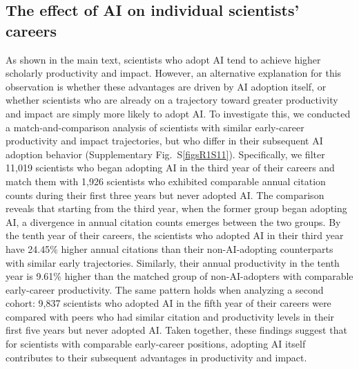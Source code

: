 
\subsection{The effect of AI on individual scientists’ careers}
\label{The effect of AI on individual scientists’ careers}
As shown in the main text, scientists who adopt AI tend to achieve higher scholarly productivity and impact.
However, an alternative explanation for this observation is whether these advantages are driven by AI adoption itself, or whether scientists who are already on a trajectory toward greater productivity and impact are simply more likely to adopt AI.
To investigate this, we conducted a match-and-comparison analysis of scientists with similar early-career productivity and impact trajectories, but who differ in their subsequent AI adoption behavior (Supplementary Fig.~S\ref{figsR1S11}).
Specifically, we filter 11,019 scientists who began adopting AI in the third year of their careers and match them with 1,926 scientists who exhibited comparable annual citation counts during their first three years but never adopted AI.
The comparison reveals that starting from the third year, when the former group began adopting AI, a divergence in annual citation counts emerges between the two groups.
By the tenth year of their careers, the scientists who adopted AI in their third year have 24.45\% higher annual citations than their non-AI-adopting counterparts with similar early trajectories.
Similarly, their annual productivity in the tenth year is 9.61\% higher than the matched group of non-AI-adopters with comparable early-career productivity.
The same pattern holds when analyzing a second cohort: 9,837 scientists who adopted AI in the fifth year of their careers were compared with peers who had similar citation and productivity levels in their first five years but never adopted AI.
Taken together, these findings suggest that for scientists with comparable early-career positions, adopting AI itself contributes to their subsequent advantages in productivity and impact.


